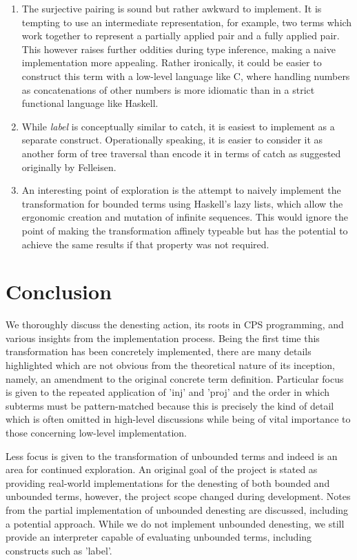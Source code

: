 \documentclass[12pt,a4paper]{report}
\theoremstyle{definition}
\theoremstyle{definition}
\theoremstyle{remark}
\begin{document}
\begin{enumerate}
    \item The surjective pairing is sound but rather awkward to implement. It is tempting to use an intermediate representation, for example, two terms which work together to represent a partially applied pair and a fully applied pair. This however raises further oddities during type inference, making a naive implementation more appealing. Rather ironically, it could be easier to construct this term with a low-level language like C, where handling numbers as concatenations of other numbers is more idiomatic than in a strict functional language like Haskell.
    
    \item While \emph{label} is conceptually similar to catch, it is easiest to implement as a separate construct. Operationally speaking, it is easier to consider it as another form of tree traversal than encode it in terms of catch as suggested originally by Felleisen.

    \item An interesting point of exploration is the attempt to naively implement the transformation for bounded terms using Haskell's lazy lists, which allow the ergonomic creation and mutation of infinite sequences. This would ignore the point of making the transformation affinely typeable but has the potential to achieve the same results if that property was not required. 
\end{enumerate}

\section{Conclusion}
We thoroughly discuss the denesting action, its roots in CPS programming, and various insights from the implementation process. Being the first time this transformation has been concretely implemented, there are many details highlighted which are not obvious from the theoretical nature of its inception, namely, an amendment to the original concrete term definition. Particular focus is given to the repeated application of 'inj' and 'proj' and the order in which subterms must be pattern-matched because this is precisely the kind of detail which is often omitted in high-level discussions while being of vital importance to those concerning low-level implementation.

Less focus is given to the transformation of unbounded terms and indeed is an area for continued exploration. An original goal of the project is stated as providing real-world implementations for the denesting of both bounded and unbounded terms, however, the project scope changed during development. Notes from the partial implementation of unbounded denesting are discussed, including a potential approach. While we do not implement unbounded denesting, we still provide an interpreter capable of evaluating unbounded terms, including constructs such as 'label'.
\end{document}
